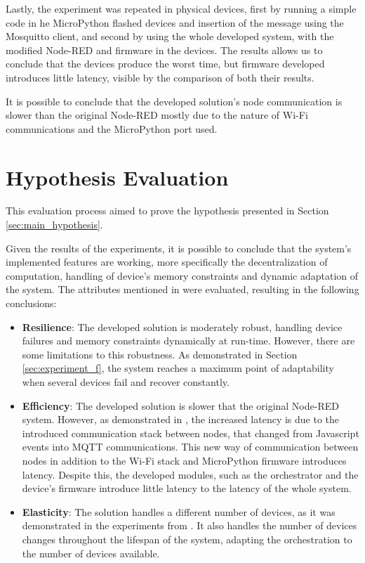 Lastly, the experiment was repeated in physical devices, first by running a simple code in he MicroPython flashed devices and insertion of the message using the Mosquitto client, and second by using the whole developed system, with the modified Node-RED and firmware in the devices. The results allows us to conclude that the devices produce the worst time, but firmware developed introduces little latency, visible by the comparison of both their results.

It is possible to conclude that the developed solution's node communication is slower than the original Node-RED mostly due to the nature of Wi-Fi communications and the MicroPython port used.   

\section{Hypothesis Evaluation}\label{sec:evaluation_hypothesis}

This evaluation process aimed to prove the hypothesis presented in Section \ref{sec:main_hypothesis}.

Given the results of the experiments, it is possible to conclude that the system's implemented features are working, more specifically the decentralization of computation, handling of device's memory constraints and dynamic adaptation of the system. The attributes mentioned in  were evaluated, resulting in the following conclusions:

\begin{itemize}
    \item \textbf{Resilience}: The developed solution is moderately robust, handling device failures and memory constraints dynamically at run-time. However, there are some limitations to this robustness. As demonstrated in Section \ref{sec:experiment_f}, the system reaches a maximum point of adaptability when several devices fail and recover constantly.
    \item \textbf{Efficiency}: The developed solution is slower that the original Node-RED system. However, as demonstrated in , the increased latency is due to the introduced communication stack between nodes, that changed from Javascript events into MQTT communications. This new way of communication between nodes in addition to the Wi-Fi stack and MicroPython firmware introduces latency. Despite this, the developed modules, such as the orchestrator and the device's firmware introduce little latency to the latency of the whole system.
    \item \textbf{Elasticity}: The solution handles a different number of devices, as it was demonstrated in the experiments from . It also handles the number of devices changes throughout the lifespan of the system, adapting the orchestration to the number of devices available.
\end{itemize}


